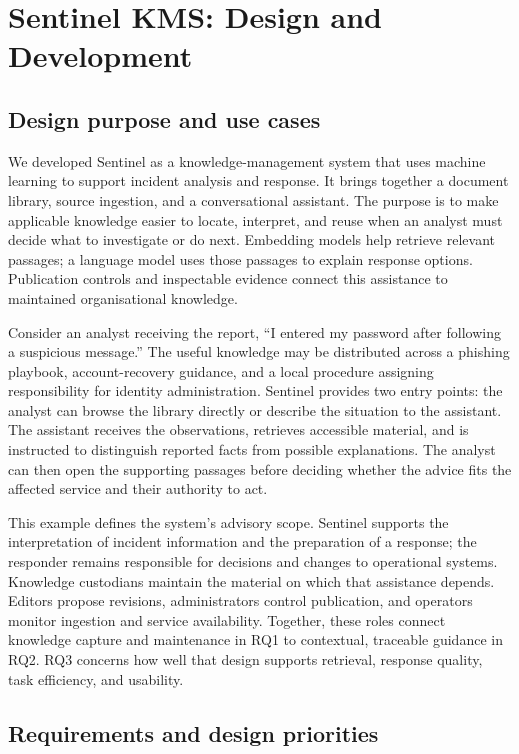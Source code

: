 \chapter{Sentinel KMS: Design and Development}\label{ch:system}

\section{Design purpose and use cases}

We developed Sentinel as a knowledge-management system that uses machine learning to support incident analysis and response. It brings together a document library, source ingestion, and a conversational assistant. The purpose is to make applicable knowledge easier to locate, interpret, and reuse when an analyst must decide what to investigate or do next. Embedding models help retrieve relevant passages; a language model uses those passages to explain response options. Publication controls and inspectable evidence connect this assistance to maintained organisational knowledge.

Consider an analyst receiving the report, ``I entered my password after following a suspicious message.'' The useful knowledge may be distributed across a phishing playbook, account-recovery guidance, and a local procedure assigning responsibility for identity administration. Sentinel provides two entry points: the analyst can browse the library directly or describe the situation to the assistant. The assistant receives the observations, retrieves accessible material, and is instructed to distinguish reported facts from possible explanations. The analyst can then open the supporting passages before deciding whether the advice fits the affected service and their authority to act.

This example defines the system's advisory scope. Sentinel supports the interpretation of incident information and the preparation of a response; the responder remains responsible for decisions and changes to operational systems. Knowledge custodians maintain the material on which that assistance depends. Editors propose revisions, administrators control publication, and operators monitor ingestion and service availability. Together, these roles connect knowledge capture and maintenance in RQ1 to contextual, traceable guidance in RQ2. RQ3 concerns how well that design supports retrieval, response quality, task efficiency, and usability.

\section{Requirements and design priorities}

